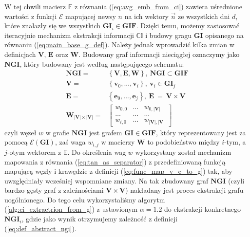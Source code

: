 W tej chwili macierz $\mathbb{E}$ z równania (\ref{eq:avg_emb_from_ci}) zawiera
uśrednione wartości z funkcji $\mathcal{E}$ mapującej newsy $n$ na ich wektory $\vec{n}$
ze wszystkich dni $d$, które znalazły się we wszystkich $\mathbf{GI}_i \in \mathbf{GIF}$.
Dzięki temu, możemy zastosować iteracyjnie mechanizm ekstrakcji informacji $\mathbb{CI}$
i budowy gragu $\mathbf{GI}$ opisanego na równaniu (\ref{eq:main_base_g_def}). 
Należy jednak wprowadzić kilka zmian w definicjach  $\mathbf{V}$, $\mathbf{E}$ 
oraz $\mathbf{W}$. Budowany graf informacji nieciągłej oznaczymy jako $\mathbf{NGI}$,
który budowany jest według następującego schematu:
\begin{equation}
    \begin{aligned}
        \mathbf{NGI} = &
            \left\{
                \mathbf{V}, \mathbf{E}, \mathbf{W}
            \right\}, \: \mathbf{NGI} \subset \mathbf{GIF}
        \\
        \mathbf{V} = &
            \left\{ 
                \mathbf{v}_{0}, ..., \mathbf{v}_{i} 
            \right\}, \: \mathbf{v}_i \in \mathbf{GI}_j
        \\
        \mathbf{E} = &
            \left\{ 
                \mathbf{e}_{0}, ..., \mathbf{e}_{j} 
            \right\}, \: 
            \mathbf{E} \: = \: \mathbf{V} \times \mathbf{V}
        \\
        \mathbf{W}_{|\mathbf{V}| \times |\mathbf{V}|} = &
            \left[ 
                \begin{array}{ccc}
                    w_{0, 0} & \dots & w_{0, |\mathbf{V}|} 
                    \\
                    \dots & \dots & \dots 
                    \\
                    w_{i, 0} & \dots & w_{|\mathbf{V}|, |\mathbf{V}|}
                \end{array}
            \right]
    \end{aligned}
\end{equation}
czyli węzeł $w$ w grafie $\mathbf{NGI}$ jest grafem $\mathbf{GI} \in \mathbf{GIF}$,
który reprezentowany jest za pomocą $\mathcal{E}(\mathbf{GI})$, zaś waga $w_{i, j}$
w macierzy $\mathbf{W}$ to podobieństwo między $i$-tym, a $j$-otym wektorem z $\mathbb{E}$.
Do określenia wag $w$ wykorzystany został mechanizm mapowania z równania 
(\ref{eq:tan_as_separator}) z przedefiniowaną funkcją mapującą węzły i krawędzie
z definicji (\ref{eq:func_map_v_e_to_g}) tak, aby uwzględniały wcześniej wspomniane zmiany.
Na tak zbudowany graf $\mathbf{NGI}$ (czyli bardzo gęsty graf z zależnościami 
$\mathbf{V} \times \mathbf{V}$) nakładany jest proces ekstrakcji grafu uogólnionego. 
Do tego celu wykorzystaliśmy algorytm (\ref{alg:ci_extractrion_from_g}) 
z ustawionym $\alpha = 1.2$ do ekstrakcji konkretnego $\mathbf{NGI}_i$,
gdzie jako wynik otrzymujemy zależność z definicji (\ref{eq:def_abstract_ngi}).

